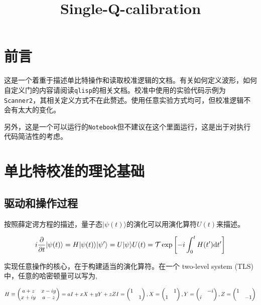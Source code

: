 \documentclass[11pt]{article}
\title{Single-Q-calibration}
\begin{document}
    
    \maketitle
    
    

    
    \section{前言}\label{ux524dux8a00}

    这是一个着重于描述单比特操作和读取校准逻辑的文档。有关如何定义波形，如何自定义门的内容请阅读\texttt{qlisp}的相关文档。校准中使用的实验代码示例为\texttt{Scanner2}，其相关定义方式不在此赘述。使用任意实验方式均可，但校准逻辑不会有太大的变化。

另外，这是一个可以运行的\texttt{Notebook}但不建议在这个里面运行，这是出于对执行代码简洁性的考虑。

    \section{单比特校准的理论基础}\label{ux5355ux6bd4ux7279ux6821ux51c6ux7684ux7406ux8bbaux57faux7840}

    \subsection{驱动和操作过程}\label{ux9a71ux52a8ux548cux64cdux4f5cux8fc7ux7a0b}

    按照薛定谔方程的描述，量子态\(|\psi(t)\rangle\)的演化可以用演化算符\(U(t)\)来描述。

\[
i\frac{\partial}{\partial t}|\psi(t)\rangle=H|\psi(t)\rangle\\
|\psi'\rangle=U|\psi\rangle\\\notag
U(t)={\mathcal T}\exp\left[-i\int_0^tH(t'){\rm d}t'\right]
\]

实现任意操作的核心，在于构建适当的演化算符。在一个 two-level system
(TLS) 中，任意的哈密顿量可以写为,

\[
H\equiv\begin{pmatrix}a+z&x-iy\\x+iy&a-z\end{pmatrix}=aI+xX+yY+zZ\\
I=\begin{pmatrix}1&\\&1\end{pmatrix}, X=\begin{pmatrix}&1\\1&\end{pmatrix}, Y=\begin{pmatrix}&-i\\i&\end{pmatrix}, Z=\begin{pmatrix}1&\\&-1\end{pmatrix}
\]
\end{document}
